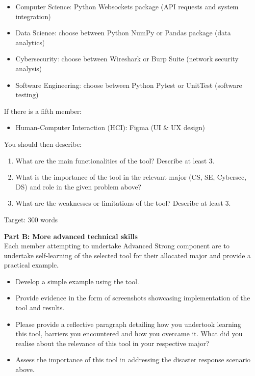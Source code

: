 \documentclass[a4paper, 11pt]{report}
\begin{document}
\begin{itemize}
    \item Computer Science: Python Websockets package (API requests and system integration)
    \item Data Science: choose between Python NumPy or Pandas package (data analytics)
    \item Cybersecurity: choose between Wireshark or Burp Suite (network security analysis)
    \item Software Engineering: choose between Python Pytest or UnitTest (software testing)
\end{itemize}
If there is a fifth member:
\begin{itemize}
    \item Human-Computer Interaction (HCI): Figma (UI \& UX design)
\end{itemize}

\vspace{4ex}

You should then describe:
\begin{enumerate}
    \item What are the main functionalities of the tool? Describe at least 3.
    \item What is the importance of the tool in the relevant major (CS, SE, Cybersec, DS) and role in the given problem above?
    \item What are the weaknesses or limitations of the tool? Describe at least 3.
\end{enumerate}
Target: 300 words

\vspace{4ex}

\textbf{Part B: More advanced technical skills}\\

Each member attempting to undertake Advanced Strong component are to undertake self-learning of the selected tool for their allocated major and provide a practical example.

\begin{itemize}
    \item Develop a simple example using the tool.
    \item Provide evidence in the form of screenshots showcasing implementation of the tool and results.
    \item Please provide a reflective paragraph detailing how you undertook learning this tool, barriers you encountered and how you overcame it. What did you realise about the relevance of this tool in your respective major?
    \item Assess the importance of this tool in addressing the disaster response scenario above.
\end{itemize}
\end{document}
